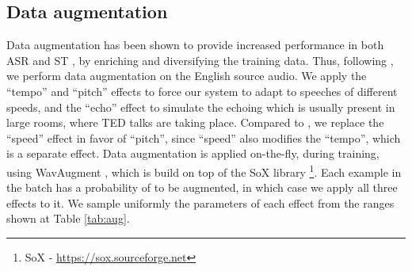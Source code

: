 \documentclass[11pt,a4paper]{article}
\begin{document}
        \begin{table}[t]
            \centering
            \caption{Training splits with their original and filtered sizes measured in hours, and the sampling ratios for each split in every training epoch.}
            \label{tab:train_data}
        \end{table}


    \subsection{Data augmentation} \label{sec:data_aug}
    
        Data augmentation has been shown to provide increased performance in both ASR \cite{specaugment} and ST \cite{fbk2019}, by enriching and diversifying the training data. Thus, following \citet{srpol2019}, we perform data augmentation on the English source audio. We apply the “tempo” and “pitch” effects to force our system to adapt to speeches of different speeds, and the “echo” effect to simulate the echoing which is usually present in large rooms, where TED talks are taking place. Compared to \citet{srpol2019}, we replace the “speed” effect in favor of “pitch”, since “speed” also modifies the “tempo”, which is a separate effect. Data augmentation is applied on-the-fly, during training, using WavAugment \cite{wavaugment2020}, which is build on top of the SoX library \footnote{SoX - \url{https://sox.sourceforge.net}}. Each example in the batch has a probability of  to be augmented, in which case we apply all three effects to it. We sample uniformly the parameters of each effect from the ranges shown at Table \ref{tab:aug}.
        
\end{document}
